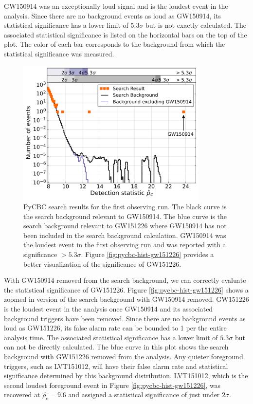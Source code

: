 GW150914 
was an exceptionally loud signal and is the loudest event in the 
analysis. Since there are no background events as loud as GW150914, 
its statistical significance has a lower limit of $5.3\sigma$ 
but is not exactly calculated. The associated statistical significance 
is listed on the horizontal bars on the top of the plot. The color 
of each bar corresponds to the background from which the statistical 
significance was measured.  

\begin{figure}[ht!]%
\includegraphics[width=0.85\textwidth]{figures/O1/pycbc_hist_GW150914}
\caption[PyCBC result histograms for GW150914]{PyCBC search results for %
         the first observing run. The black curve is the search background %
         relevant to GW150914. The blue curve is the search background %
         relevant to GW151226 where GW150914 has not been included in the %
         search background calculation. GW150914 was the loudest event in %
         the first observing run and was reported with a significance %
         $> 5.3\sigma$. Figure \ref{fig:pycbc-hist-gw151226} provides %
         a better visualization of the significance of GW151226.}
\label{fig:pycbc-hist-gw150914}
\end{figure}

With GW150914 removed from the search background, we can correctly evaluate the 
statistical significance of GW151226. 
Figure \ref{fig:pycbc-hist-gw151226} shows a zoomed in version
of the search background with GW150914 removed. 
GW151226 is the loudest event in the analysis once GW150914 and its associated 
background triggers have been removed. Since there are no background events 
as loud as GW151226, its false alarm rate can be bounded to 1 per the entire 
analysis time. The associated statistical significance has a lower limit of 
$5.3\sigma$ but can not be directly calculated. The blue curve in this plot 
shows the search background with GW151226 removed from the analysis. Any 
quieter foreground triggers, such as LVT151012, will have their false alarm 
rate and statistical significance determined by this background distribution.  
LVT151012, which is the second loudest foreground event in Figure 
\ref{fig:pycbc-hist-gw151226}, was recovered at $\hat{\rho_c} = 9.6$ and 
assigned a statistical significance of just under $2\sigma$.  

